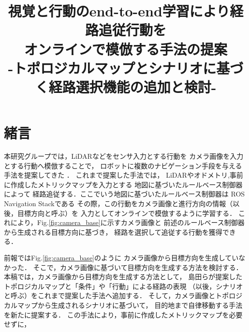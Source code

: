 \documentclass{sice-si}
\title{視覚と行動のend-to-end学習により経路追従行動を\\
オンラインで模倣する手法の提案\\
-トポロジカルマップとシナリオに基づく経路選択機能の追加と検討-\\} %
\begin{document}

\maketitle

\section{緒言}
本研究グループでは，LiDARなどをセンサ入力とする行動を
カメラ画像を入力とする行動へ模倣することで，
ロボットに複数のナビゲーション手段を与える手法を提案してきた
\cite{haruyama2022}\cite{fujiwara2023}．
これまで提案した手法では，
LiDARやオドメトリ,事前に作成したメトリックマップを入力とする
地図に基づいたルールベース制御器によって
経路追従する．ここでいう地図に基づいたルールベース制御器は
ROS Navigation Stack\cite{ros-navigation}である
その際，この行動をカメラ画像と進行方向の情報（以後，目標方向と呼ぶ）を
入力としてオンラインで模倣するように学習する．
これにより，Fig.\ref{fig:camera_base}に示すカメラ画像と
前述のルールベース制御器から生成される目標方向に基づき，
経路を選択して追従する行動を獲得できる．
\par
前報\cite{haruyama2022}\cite{fujiwara2023}ではFig.\ref{fig:camera_base}のように
カメラ画像から目標方向を生成していなかった．
そこで，カメラ画像に基づいて目標方向を生成する方法を検討する．
本稿では，カメラ画像から目標方向を生成する方法として，
島田ら\cite{shimada2020}が提案したトポロジカルマップと「条件」や「行動」による経路の表現
（以後，シナリオと呼ぶ）をこれまで提案した手法へ追加する．
そして，カメラ画像とトポロジカルマップから生成されるシナリオに基づいて，
目的地まで自律移動する手法を新たに提案する．
この手法により，事前に作成したメトリックマップを必要せずに，
\end{document}

